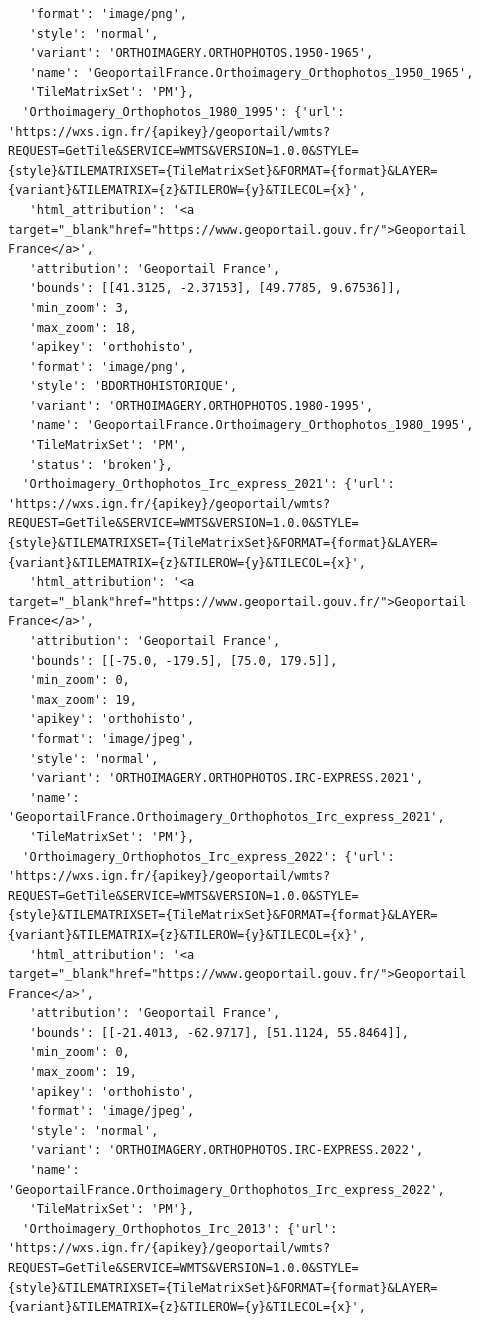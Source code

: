 \documentclass[
  letterpaper,
  DIV=11,
  numbers=noendperiod]{scrreprt}
\begin{document}
\begin{verbatim}
   'format': 'image/png',
   'style': 'normal',
   'variant': 'ORTHOIMAGERY.ORTHOPHOTOS.1950-1965',
   'name': 'GeoportailFrance.Orthoimagery_Orthophotos_1950_1965',
   'TileMatrixSet': 'PM'},
  'Orthoimagery_Orthophotos_1980_1995': {'url': 'https://wxs.ign.fr/{apikey}/geoportail/wmts?REQUEST=GetTile&SERVICE=WMTS&VERSION=1.0.0&STYLE={style}&TILEMATRIXSET={TileMatrixSet}&FORMAT={format}&LAYER={variant}&TILEMATRIX={z}&TILEROW={y}&TILECOL={x}',
   'html_attribution': '<a target="_blank"href="https://www.geoportail.gouv.fr/">Geoportail France</a>',
   'attribution': 'Geoportail France',
   'bounds': [[41.3125, -2.37153], [49.7785, 9.67536]],
   'min_zoom': 3,
   'max_zoom': 18,
   'apikey': 'orthohisto',
   'format': 'image/png',
   'style': 'BDORTHOHISTORIQUE',
   'variant': 'ORTHOIMAGERY.ORTHOPHOTOS.1980-1995',
   'name': 'GeoportailFrance.Orthoimagery_Orthophotos_1980_1995',
   'TileMatrixSet': 'PM',
   'status': 'broken'},
  'Orthoimagery_Orthophotos_Irc_express_2021': {'url': 'https://wxs.ign.fr/{apikey}/geoportail/wmts?REQUEST=GetTile&SERVICE=WMTS&VERSION=1.0.0&STYLE={style}&TILEMATRIXSET={TileMatrixSet}&FORMAT={format}&LAYER={variant}&TILEMATRIX={z}&TILEROW={y}&TILECOL={x}',
   'html_attribution': '<a target="_blank"href="https://www.geoportail.gouv.fr/">Geoportail France</a>',
   'attribution': 'Geoportail France',
   'bounds': [[-75.0, -179.5], [75.0, 179.5]],
   'min_zoom': 0,
   'max_zoom': 19,
   'apikey': 'orthohisto',
   'format': 'image/jpeg',
   'style': 'normal',
   'variant': 'ORTHOIMAGERY.ORTHOPHOTOS.IRC-EXPRESS.2021',
   'name': 'GeoportailFrance.Orthoimagery_Orthophotos_Irc_express_2021',
   'TileMatrixSet': 'PM'},
  'Orthoimagery_Orthophotos_Irc_express_2022': {'url': 'https://wxs.ign.fr/{apikey}/geoportail/wmts?REQUEST=GetTile&SERVICE=WMTS&VERSION=1.0.0&STYLE={style}&TILEMATRIXSET={TileMatrixSet}&FORMAT={format}&LAYER={variant}&TILEMATRIX={z}&TILEROW={y}&TILECOL={x}',
   'html_attribution': '<a target="_blank"href="https://www.geoportail.gouv.fr/">Geoportail France</a>',
   'attribution': 'Geoportail France',
   'bounds': [[-21.4013, -62.9717], [51.1124, 55.8464]],
   'min_zoom': 0,
   'max_zoom': 19,
   'apikey': 'orthohisto',
   'format': 'image/jpeg',
   'style': 'normal',
   'variant': 'ORTHOIMAGERY.ORTHOPHOTOS.IRC-EXPRESS.2022',
   'name': 'GeoportailFrance.Orthoimagery_Orthophotos_Irc_express_2022',
   'TileMatrixSet': 'PM'},
  'Orthoimagery_Orthophotos_Irc_2013': {'url': 'https://wxs.ign.fr/{apikey}/geoportail/wmts?REQUEST=GetTile&SERVICE=WMTS&VERSION=1.0.0&STYLE={style}&TILEMATRIXSET={TileMatrixSet}&FORMAT={format}&LAYER={variant}&TILEMATRIX={z}&TILEROW={y}&TILECOL={x}',

\end{verbatim}
\end{document}
